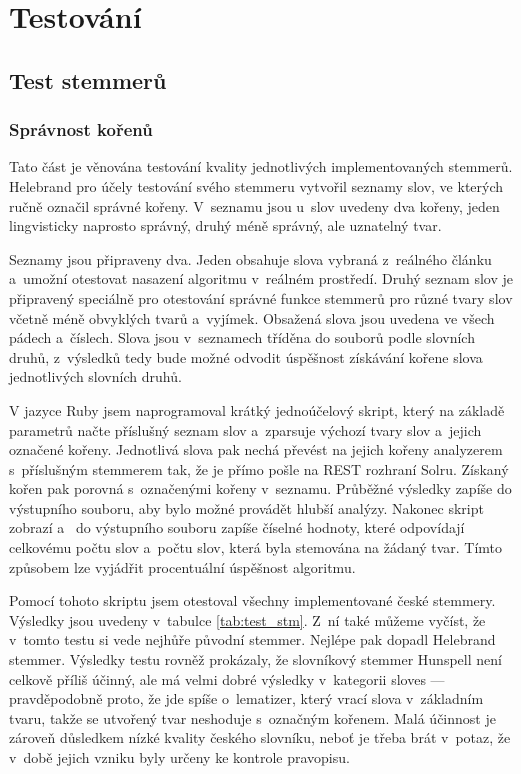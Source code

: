 \chapter{Testování} \label{testing}
\section{Test stemmerů}
\subsection{Správnost kořenů}
Tato část je věnována testování kvality jednotlivých implementovaných stemmerů. Helebrand pro účely testování svého stemmeru vytvořil seznamy slov, ve kterých ručně označil správné kořeny. V~seznamu jsou u~slov uvedeny dva kořeny, jeden lingvisticky naprosto správný, druhý méně správný, ale uznatelný tvar.

Seznamy jsou připraveny dva. Jeden obsahuje slova vybraná z~reálného článku a~umožní otestovat nasazení algoritmu v~reálném prostředí. Druhý seznam slov je připravený speciálně pro otestování správné funkce stemmerů pro různé tvary slov včetně méně obvyklých tvarů a~vyjímek. Obsažená slova jsou uvedena ve všech pádech a~číslech. Slova jsou v~seznamech tříděna do souborů podle slovních druhů, z~výsledků tedy bude možné odvodit úspěšnost získávání kořene slova jednotlivých slovních druhů.

V jazyce Ruby jsem naprogramoval krátký jednoúčelový skript, který na základě parametrů načte příslušný seznam slov a~zparsuje výchozí tvary slov a~jejich označené kořeny. Jednotlivá slova pak nechá převést na jejich kořeny analyzerem s~příslušným stemmerem tak, že je přímo pošle na REST rozhraní Solru. Získaný kořen pak porovná s~označenými kořeny v~seznamu. Průběžné výsledky zapíše do výstupního souboru, aby bylo možné provádět hlubší analýzy. Nakonec skript zobrazí a~ do výstupního souboru zapíše číselné hodnoty, které odpovídají celkovému počtu slov a~počtu slov, která byla stemována na žádaný tvar. Tímto způsobem lze vyjádřit procentuální úspěšnost algoritmu.

Pomocí tohoto skriptu jsem otestoval všechny implementované české stemmery. Výsledky jsou uvedeny v~tabulce \ref{tab:test_stm}. Z~ní také můžeme vyčíst, že v~tomto testu si vede nejhůře původní stemmer. Nejlépe pak dopadl Helebrand stemmer. Výsledky testu rovněž prokázaly, že slovníkový stemmer Hunspell není celkově příliš účinný, ale má velmi dobré výsledky v~kategorii sloves --- pravděpodobně proto, že jde spíše o~lematizer, který vrací slova v~základním tvaru, takže se utvořený tvar neshoduje s~označným kořenem. Malá účinnost je zároveň důsledkem nízké kvality českého slovníku, neboť je třeba brát v~potaz, že v~době jejich vzniku byly určeny ke kontrole pravopisu.

